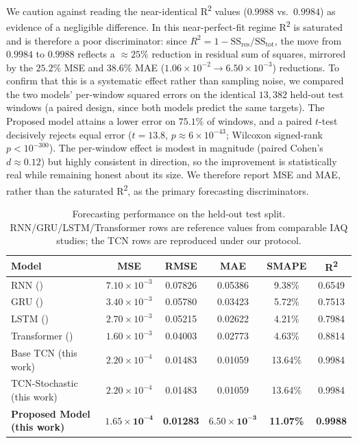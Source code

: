 We caution against reading the near-identical R\textsuperscript{2} values ($0.9988$ vs.\ $0.9984$) as evidence of a negligible difference. In this near-perfect-fit regime R\textsuperscript{2} is saturated and is therefore a poor discriminator: since $R^2 = 1 - \mathrm{SS_{res}}/\mathrm{SS_{tot}}$, the move from $0.9984$ to $0.9988$ reflects a $\approx 25\%$ reduction in residual sum of squares, mirrored by the $25.2\%$ MSE and $38.6\%$ MAE ($1.06\times 10^{-2} \to 6.50\times 10^{-3}$) reductions. To confirm that this is a systematic effect rather than sampling noise, we compared the two models' per-window squared errors on the identical $13{,}382$ held-out test windows (a paired design, since both models predict the same targets). The Proposed model attains a lower error on $75.1\%$ of windows, and a paired $t$-test decisively rejects equal error ($t=13.8$, $p \approx 6\times 10^{-43}$; Wilcoxon signed-rank $p < 10^{-300}$). The per-window effect is modest in magnitude (paired Cohen's $d \approx 0.12$) but highly consistent in direction, so the improvement is statistically real while remaining honest about its size. We therefore report MSE and MAE, rather than the saturated R\textsuperscript{2}, as the primary forecasting discriminators.

\begin{table}[H]
\centering
\caption{Forecasting performance on the held-out test split. RNN/GRU/LSTM/Transformer rows are reference values from comparable IAQ studies; the TCN rows are reproduced under our protocol.}
\label{table:forecasting}
\setlength{\tabcolsep}{4.5pt}
\small
\begin{tabular}{lccccc}
\toprule
\textbf{Model} & \textbf{MSE} & \textbf{RMSE} & \textbf{MAE} & \textbf{SMAPE} & \textbf{R\textsuperscript{2}} \\
\midrule
RNN (\cite{cho2014gru})                  & $7.10\times 10^{-3}$ & 0.07826 & 0.05386 & 9.38\%  & 0.6549 \\
GRU (\cite{cho2014gru})                  & $3.40\times 10^{-3}$ & 0.05780 & 0.03423 & 5.72\%  & 0.7513 \\
LSTM (\cite{hochreiter1997lstm})                 & $2.70\times 10^{-3}$ & 0.05215 & 0.02622 & 4.21\%  & 0.7984 \\
Transformer (\cite{vaswani2017attention})          & $1.60\times 10^{-3}$ & 0.04003 & 0.02773 & 4.63\%  & 0.8814 \\
Base TCN (this work)             & $2.20\times 10^{-4}$ & 0.01483 & 0.01059 & 13.64\% & 0.9984 \\
TCN-Stochastic (this work)       & $2.20\times 10^{-4}$ & 0.01483 & 0.01059 & 13.64\% & 0.9984 \\
\textbf{Proposed Model (this work)} & $\mathbf{1.65\times 10^{-4}}$ & \textbf{0.01283} & $\mathbf{6.50\times 10^{-3}}$ & \textbf{11.07\%} & \textbf{0.9988} \\
\bottomrule
\end{tabular}
\end{table}

